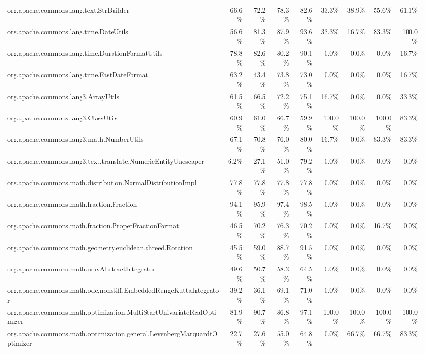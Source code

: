 \begin{tabular}{ l rrrr rrrr}
org.apache.commons.lang.text.StrBuilder &  66.6\% &  72.2\% &  78.3\% &  82.6\% &  33.3\% &  38.9\% &  55.6\% &  61.1\%\\ 
org.apache.commons.lang.time.DateUtils &  56.6\% &  81.3\% &  87.9\% &  93.6\% &  33.3\% &  16.7\% &  83.3\% &  100.0\%\\ 
org.apache.commons.lang.time.DurationFormatUtils &  78.8\% &  82.6\% &  80.2\% &  90.1\% &  0.0\% &  0.0\% &  0.0\% &  16.7\%\\ 
org.apache.commons.lang.time.FastDateFormat &  63.2\% &  43.4\% &  73.8\% &  73.0\% &  0.0\% &  0.0\% &  0.0\% &  16.7\%\\ 
org.apache.commons.lang3.ArrayUtils &  61.5\% &  66.5\% &  72.2\% &  75.1\% &  16.7\% &  0.0\% &  0.0\% &  33.3\%\\ 
org.apache.commons.lang3.ClassUtils &  60.9\% &  61.0\% &  66.7\% &  59.9\% &  100.0\% &  100.0\% &  100.0\% &  83.3\%\\ 
org.apache.commons.lang3.math.NumberUtils &  67.1\% &  70.8\% &  76.0\% &  80.0\% &  16.7\% &  0.0\% &  83.3\% &  83.3\%\\ 
org.apache.commons.lang3.text.translate.NumericEntityUnescaper &  6.2\% &  27.1\% &  51.0\% &  79.2\% &  0.0\% &  0.0\% &  0.0\% &  0.0\%\\ 
org.apache.commons.math.distribution.NormalDistributionImpl &  77.8\% &  77.8\% &  77.8\% &  77.8\% &  0.0\% &  0.0\% &  0.0\% &  0.0\%\\ 
org.apache.commons.math.fraction.Fraction &  94.1\% &  95.9\% &  97.4\% &  98.5\% &  0.0\% &  0.0\% &  0.0\% &  0.0\%\\ 
org.apache.commons.math.fraction.ProperFractionFormat &  46.5\% &  70.2\% &  76.3\% &  70.2\% &  0.0\% &  0.0\% &  16.7\% &  0.0\%\\ 
org.apache.commons.math.geometry.euclidean.threed.Rotation &  45.5\% &  59.0\% &  88.7\% &  91.5\% &  0.0\% &  0.0\% &  0.0\% &  0.0\%\\ 
org.apache.commons.math.ode.AbstractIntegrator &  49.6\% &  50.7\% &  58.3\% &  64.5\% &  0.0\% &  0.0\% &  0.0\% &  0.0\%\\ 
org.apache.commons.math.ode.nonstiff.EmbeddedRungeKuttaIntegrator &  39.2\% &  36.1\% &  69.1\% &  71.0\% &  0.0\% &  0.0\% &  0.0\% &  0.0\%\\ 
org.apache.commons.math.optimization.MultiStartUnivariateRealOptimizer &  81.9\% &  90.7\% &  86.8\% &  97.1\% &  100.0\% &  100.0\% &  100.0\% &  100.0\%\\ 
org.apache.commons.math.optimization.general.LevenbergMarquardtOptimizer &  22.7\% &  27.6\% &  55.0\% &  64.8\% &  0.0\% &  66.7\% &  66.7\% &  83.3\%\\ 

\end{tabular}
